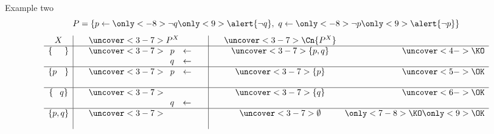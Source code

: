 \begin{frame}{Example two}
\[
P
=
\left\{
    p \leftarrow \only<-8>{\neg q}\only<9>{\alert{\neg q}}, \
    q \leftarrow \only<-8>{\neg p}\only<9>{\alert{\neg p}}
\right\}
\]
\pause
\newcommand{\PIipiq}{%
    \begin{array}[t]{lll}
      &&
      \\
      &&
    \end{array}}
\newcommand{\PIipoq}{%
    \begin{array}[t]{lll}
      p &\leftarrow&
      \\
      &&
    \end{array}}
\newcommand{\PIopiq}{%
    \begin{array}[t]{lll}
      &&
      \\
      q &\leftarrow&
    \end{array}}
\newcommand{\PIopoq}{%
    \begin{array}[t]{lll}
      p &\leftarrow&
      \\
      q &\leftarrow&
    \end{array}}
\[
\begin{array}{c|cl|ccr}
       X                   &\ &\uncover<3-7>{P^X}  &\ &\uncover<3-7>{\Cn{P^X}}&              \\\hline
\{\phantom{p         ,q}\} &  &\uncover<3-7>{\PIopoq}&  &\uncover<3-7>{\{p,q\}}   &\uncover<4->{\KO}\\\hline
\{         p\phantom{,q}\} &  &\uncover<3-7>{\PIipoq}&  &\uncover<3-7>{\{p\}}     &\uncover<5->{\OK}\\\hline
\{\phantom{p,}        q \} &  &\uncover<3-7>{\PIopiq}&  &\uncover<3-7>{\{q\}}     &\uncover<6->{\OK}\\\hline
\{         p         ,q \} &  &\uncover<3-7>{\PIipiq}&  &\uncover<3-7>{\emptyset} &  \only<7-8>{\KO}\only<9>{\OK}
\end{array}
\]
\end{frame}

